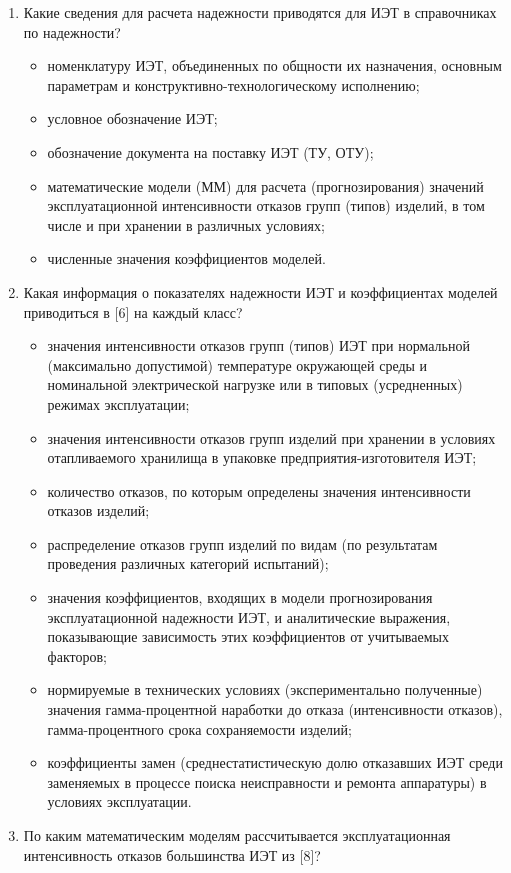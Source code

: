 \documentclass[a4paper,14pt]{article}
\begin{document}
\begin{enumerate}

\item Какие сведения для расчета надежности приводятся для ИЭТ в справочниках по надежности?
\begin{itemize}
	\item номенклатуру ИЭТ, объединенных по общности их назначения,	основным параметрам и конструктивно-технологическому исполнению;
	\item условное обозначение ИЭТ;
	\item обозначение документа на поставку ИЭТ (ТУ, ОТУ);
	\item  математические модели (ММ) для расчета (прогнозирования)	значений эксплуатационной интенсивности отказов групп (типов) изделий, в том числе и при хранении в различных условиях;
	\item численные значения коэффициентов моделей.
\end{itemize}
 
\item Какая информация о показателях надежности ИЭТ и коэффициентах моделей приводиться в [6] на каждый класс?
\begin{itemize}
	\item значения интенсивности отказов групп (типов) ИЭТ при нормальной 	(максимально допустимой) температуре окружающей среды и номинальной электрической нагрузке или в типовых (усредненных) режимах
	эксплуатации;
	\item значения интенсивности отказов групп изделий при хранении в условиях отапливаемого хранилища в упаковке предприятия-изготовителя ИЭТ;
	\item количество отказов, по которым определены значения интенсивности отказов изделий;
	\item распределение отказов групп изделий по видам (по результатам проведения различных категорий испытаний);
	\item значения коэффициентов, входящих в модели прогнозирования эксплуатационной надежности ИЭТ, и аналитические выражения, показывающие зависимость этих коэффициентов от учитываемых факторов;
	\item нормируемые в технических условиях (экспериментально полученные) значения гамма-процентной наработки до отказа	(интенсивности отказов), гамма-процентного срока сохраняемости изделий;
	\item коэффициенты замен (среднестатистическую долю отказавших ИЭТ среди заменяемых в процессе поиска неисправности и ремонта аппаратуры) в условиях эксплуатации.
\end{itemize}
\item По каким математическим моделям рассчитывается эксплуатационная интенсивность отказов большинства ИЭТ из [8]?


\end{enumerate}
\end{document}
